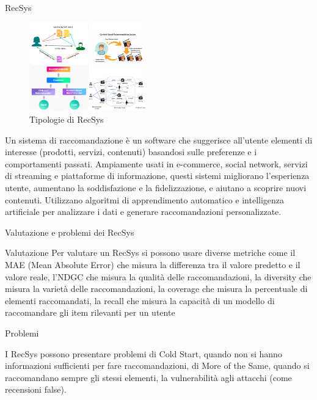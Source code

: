 
\begin{frame}{RecSys}
    \begin{figure}
    \centering
    \includegraphics[width=0.45\textwidth]{images/RecSys.png}
    \caption{Tipologie di RecSys}
\end{figure}

Un sistema di raccomandazione è un software che suggerisce all'utente elementi di interesse (prodotti, servizi, contenuti) basandosi sulle preferenze e i comportamenti passati. Ampiamente usati in e-commerce, social network, servizi di streaming e piattaforme di informazione, questi sistemi migliorano l'esperienza utente, aumentano la soddisfazione e la fidelizzazione, e aiutano a scoprire nuovi contenuti. Utilizzano algoritmi di apprendimento automatico e intelligenza artificiale per analizzare i dati e generare raccomandazioni personalizzate.
\end{frame}

\begin{frame}{Valutazione e problemi dei RecSys}
    \begin{block}{Valutazione}   
Per valutare un RecSys si possono usare diverse metriche come il MAE (Mean Absolute Error) che misura la differenza tra il valore predetto e il valore reale, l'NDGC che misura la qualità delle raccomandazioni, la diversity che misura la varietà delle raccomandazioni, la coverage che misura la percentuale di elementi raccomandati, la recall che misura la capacità di un modello di raccomandare gli item rilevanti per un utente
\end{block}
\begin{alertblock}{Problemi}

I RecSys possono presentare problemi di Cold Start, quando non si hanno informazioni sufficienti per fare raccomandazioni, di More of the Same, quando si raccomandano sempre gli stessi elementi, la vulnerabilità agli attacchi (come recensioni false).
\end{alertblock}
\end{frame}